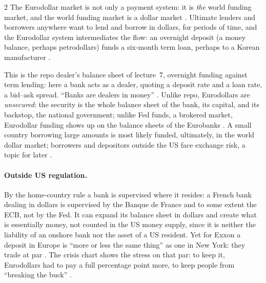 \begin{paracol}{2}
The Eurodollar market is not only a payment system: it is \emph{the} world funding market, and the world funding market is a dollar market .
Ultimate lenders and borrowers anywhere want to lend and borrow in dollars, for periods of time, and the Eurodollar system intermediates the flow: an overnight deposit (a money
balance, perhaps petrodollars) funds a six-month term loan, perhaps to a Korean manufacturer .
\begin{taccts}
\end{taccts}
This is the repo dealer's balance sheet of lecture~7, overnight funding against term lending: here a bank acts as a dealer, quoting a deposit rate and a loan rate, a bid--ask
spread. ``Banks are dealers in money'' . Unlike repo, Eurodollars are \emph{unsecured}: the security is the whole balance sheet of the
bank, its capital, and its backstop, the national government; unlike Fed funds, a brokered market, Eurodollar funding shows up on the balance sheets of the Eurobanks
. A small country borrowing large amounts is most likely funded, ultimately, in the world dollar market; borrowers and depositors outside
the US face exchange risk, a topic for later .

\paragraph{Outside US regulation.} By the home-country rule a bank is supervised where it resides: a French bank dealing in dollars is supervised by the Banque de France and to
some extent the ECB, not by the Fed. It can expand its balance sheet in dollars and create what is essentially money, not counted in the US money supply, since it is neither
the liability of an onshore bank nor the asset of a US resident. Yet for Exxon a deposit in Europe is ``more or less the same thing'' as one in New York: they trade at par
. The crisis chart shows the stress on that par: to keep it, Eurodollars had to pay a full percentage point more, to keep
people from ``breaking the buck'' .


\end{paracol}
